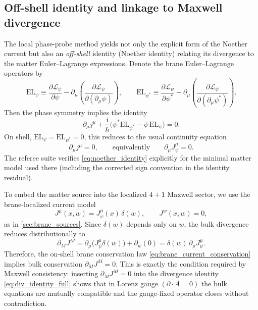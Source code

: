 \documentclass[11pt]{article}
\newcommand{\ii}{\mathrm i}
\newcommand{\A}{A}
\newcommand{\J}{J}
\begin{document}
\subsection{Off-shell identity and linkage to Maxwell divergence}
\label{sec:off_shell_identity}

The local phase-probe method yields not only the explicit form of the Noether
current but also an \emph{off-shell} identity (Noether identity) relating its
divergence to the matter Euler--Lagrange expressions. Denote the brane
Euler--Lagrange operators by
\begin{equation}
  \mathrm{EL}_{\psi} \equiv \frac{\partial\mathcal L_\psi}{\partial \psi}
  -\partial_\mu\!\left(\frac{\partial\mathcal L_\psi}{\partial(\partial_\mu\psi)}\right),
  \qquad
  \mathrm{EL}_{\psi^*} \equiv \frac{\partial\mathcal L_\psi}{\partial \psi^*}
  -\partial_\mu\!\left(\frac{\partial\mathcal L_\psi}{\partial(\partial_\mu\psi^*)}\right).
\end{equation}
Then the phase symmetry implies the identity
\begin{equation}
  \partial_\mu j^\mu
  + \frac{\ii}{\hbar}\Big(\psi^*\mathrm{EL}_{\psi^*}-\psi\,\mathrm{EL}_{\psi}\Big)
  = 0.
  \label{eq:noether_identity}
\end{equation}
On shell, \(\mathrm{EL}_\psi=\mathrm{EL}_{\psi^*}=0\), this reduces to the usual
continuity equation
\begin{equation}
  \partial_\mu j^\mu = 0,
  \qquad\text{equivalently}\qquad
  \partial_\mu J_\psi^\mu = 0.
  \label{eq:brane_current_conservation}
\end{equation}
The referee suite verifies \cref{eq:noether_identity} explicitly for the minimal
matter model used there (including the corrected sign convention in the identity
residual).

To embed the matter source into the localized \(4+1\) Maxwell sector, we use the
brane-localized current model
\begin{equation}
  \J^\mu(x,w) = J_\psi^\mu(x)\,\delta(w),
  \qquad
  \J^w(x,w)=0,
  \label{eq:J_bulk_from_brane}
\end{equation}
as in \cref{sec:brane_sources}. Since \(\delta(w)\) depends only on \(w\), the
bulk divergence reduces distributionally to
\begin{equation}
  \partial_M \J^M
  = \partial_\mu\!\big(J_\psi^\mu\delta(w)\big)
    + \partial_w(0)
  = \delta(w)\,\partial_\mu J_\psi^\mu.
\end{equation}
Therefore, the on-shell brane conservation law \cref{eq:brane_current_conservation}
implies bulk conservation \(\partial_M\J^M=0\). This is exactly the condition
required by Maxwell consistency: inserting \(\partial_M\J^M=0\) into the
divergence identity \cref{eq:div_identity_full} shows that in Lorenz gauge
\((\partial\!\cdot\!\A=0)\) the bulk equations are mutually compatible and the
gauge-fixed operator closes without contradiction.
\end{document}
